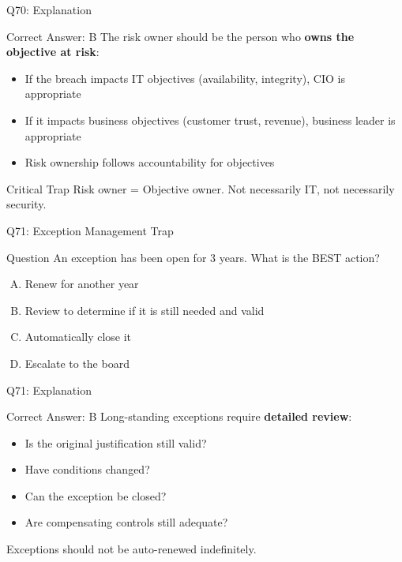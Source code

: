 \documentclass{beamer}
\begin{document}
	\begin{frame}{Q70: Explanation}
		\begin{block}{Correct Answer: B}
			The risk owner should be the person who \textbf{owns the objective at risk}:
			\begin{itemize}
				\item If the breach impacts IT objectives (availability, integrity), CIO is appropriate
				\item If it impacts business objectives (customer trust, revenue), business leader is appropriate
				\item Risk ownership follows accountability for objectives
			\end{itemize}
		\end{block}
		\begin{alertblock}{Critical Trap}
			Risk owner = Objective owner.
			Not necessarily IT, not necessarily security.
		\end{alertblock}
	\end{frame}
	
	
	\begin{frame}{Q71: Exception Management Trap}
		\begin{block}{Question}
			An exception has been open for 3 years. What is the BEST action?
		\end{block}
		\begin{enumerate}[(A)]
			\item Renew for another year
			\item Review to determine if it is still needed and valid
			\item Automatically close it
			\item Escalate to the board
		\end{enumerate}
	\end{frame}
	
	\begin{frame}{Q71: Explanation}
		\begin{block}{Correct Answer: B}
			Long-standing exceptions require \textbf{detailed review}:
			\begin{itemize}
				\item Is the original justification still valid?
				\item Have conditions changed?
				\item Can the exception be closed?
				\item Are compensating controls still adequate?
			\end{itemize}
			Exceptions should not be auto-renewed indefinitely.
		\end{block}
	\end{frame}
	
\end{document}

